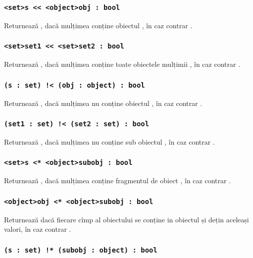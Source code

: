 \subsubsection{\lstinline|<set>s << <object>obj : bool|}

Returnează \true{}, dacă mulțimea  conține obiectul , în caz contrar \false{}.

\subsubsection{\lstinline|<set>set1 << <set>set2 : bool|}

Returnează \true, dacă mulțimea  conține toate obiectele mulțimii , în caz contrar \false.

\subsubsection{\lstinline|(s : set) !< (obj : object) : bool|}

Returnează \true{}, dacă mulțimea  nu conține obiectul , în caz contrar \false{}.

\subsubsection{\lstinline|(set1 : set) !< (set2 : set) : bool|}

Returnează \true, dacă mulțimea  nu conține sub obiectul , în caz contrar \false.

\subsubsection{\lstinline|<set>s <* <object>subobj : bool|}

Returnează \true{}, dacă mulțimea  conține fragmentul de obiect , în caz contrar \false{}.

\subsubsection{\lstinline|<object>obj <* <object>subobj : bool|}

Returnează \true{} dacă fiecare cîmp al obiectului  se conține in obiectul  și dețin aceleași valori, în caz contrar \false{}.

\subsubsection{\lstinline|(s : set) !* (subobj : object) : bool|}

